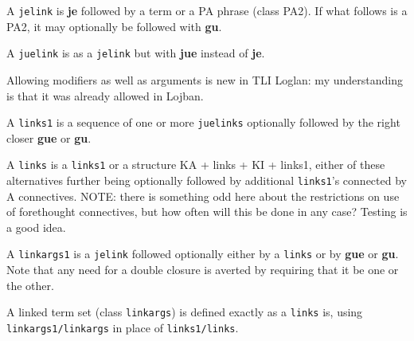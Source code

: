 \documentclass[12pt]{book}
\begin{document}
A {\tt jelink} is {\bf je} followed by a term or a PA phrase (class PA2).  If what follows is a PA2, it may optionally be followed with {\bf gu}.

A {\tt juelink} is as a {\tt jelink} but with {\bf jue} instead of {\bf je}.

Allowing modifiers as well as arguments is new in TLI Loglan:  my understanding is that it was already allowed in Lojban.

A {\tt links1} is a sequence of one or more {\tt juelinks} optionally followed by the right closer {\bf gue} or {\bf gu}.

A {\tt links} is a {\tt links1} or a structure  KA + links + KI  + links1, either of these alternatives further being optionally followed by additional {\tt links1}'s
connected by A connectives.  NOTE:  there is something odd here about the restrictions on use of forethought connectives, but how often will this be done in any case?  Testing is a good idea.

A {\tt linkargs1} is a {\tt jelink} followed optionally either by a {\tt links} or by {\bf gue} or {\bf gu}.  Note that any need for a double closure is averted by requiring that it be one or the other.

A linked term set (class {\tt linkargs}) is defined exactly as a {\tt links} is, using {\tt linkargs1/linkargs} in place of {\tt links1/links}.
\end{document}
